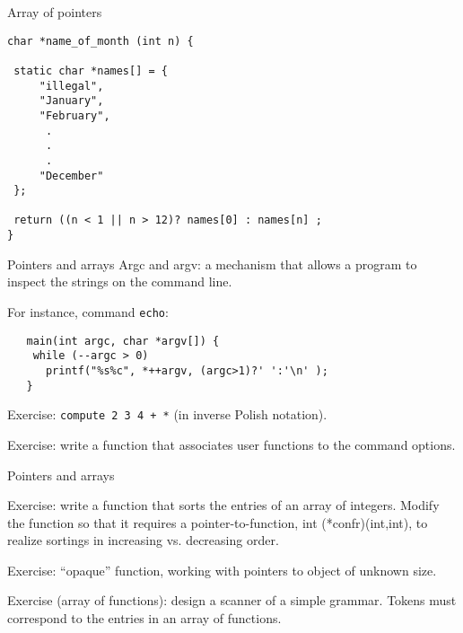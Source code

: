 \begin{frame}[fragile]{Array of pointers}
\begin{tt}
\begin{verbatim}
char *name_of_month (int n) {

 static char *names[] = {
     "illegal",
     "January",
     "February",
      .
      .
      .
     "December"
 };

 return ((n < 1 || n > 12)? names[0] : names[n] ;
}
\end{verbatim}
\end{tt}


\end{frame}
\begin{frame}[fragile]{Pointers and arrays}
Argc and argv: a mechanism that allows a program
to inspect the strings on the command line.


\vspace{20pt}

For instance, command {\tt echo}:


\vspace{20pt}

\begin{tt}
\begin{verbatim}
   main(int argc, char *argv[]) {
    while (--argc > 0)
      printf("%s%c", *++argv, (argc>1)?' ':'\n' );
   }
\end{verbatim}
\end{tt}


\vspace{20pt}

Exercise: {\tt compute 2 3 4 + *} (in inverse Polish notation).

\vspace{20pt}


Exercise: write a function that associates user functions to
the command options.

\end{frame}
\begin{frame}[fragile]{Pointers and arrays}

Exercise: write a function that sorts the entries of
an array of integers. Modify the function so that
it requires a pointer-to-function,
int (*confr)(int,int), to realize sortings in increasing vs.
decreasing order. 


\vspace{20pt}

Exercise: ``opaque'' function, working with pointers to object of
unknown size.


\vspace{20pt}

Exercise (array of functions): design a scanner of
a simple grammar. Tokens must correspond to the entries
in an array of functions.


\end{frame}
